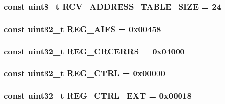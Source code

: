 \label{namespaceiGbReg_acf8e6d74b74043a94123494f59e5290c}
\hypertarget{namespaceiGbReg_ae95e1095a77a684508db779465f21ac2}{
\subsubsection[{RCV\_\-ADDRESS\_\-TABLE\_\-SIZE}]{\setlength{\rightskip}{0pt plus 5cm}const uint8\_\-t {\bf RCV\_\-ADDRESS\_\-TABLE\_\-SIZE} = 24}}
\label{namespaceiGbReg_ae95e1095a77a684508db779465f21ac2}
\hypertarget{namespaceiGbReg_a1c508b3181f153a1e8e98a6866906cd8}{
\subsubsection[{REG\_\-AIFS}]{\setlength{\rightskip}{0pt plus 5cm}const {\bf uint32\_\-t} {\bf REG\_\-AIFS} = 0x00458}}
\label{namespaceiGbReg_a1c508b3181f153a1e8e98a6866906cd8}
\hypertarget{namespaceiGbReg_a0ac38603fe50560ca10542b091cce4e3}{
\subsubsection[{REG\_\-CRCERRS}]{\setlength{\rightskip}{0pt plus 5cm}const {\bf uint32\_\-t} {\bf REG\_\-CRCERRS} = 0x04000}}
\label{namespaceiGbReg_a0ac38603fe50560ca10542b091cce4e3}
\hypertarget{namespaceiGbReg_a20020599b1b178310f589aad60b95d78}{
\subsubsection[{REG\_\-CTRL}]{\setlength{\rightskip}{0pt plus 5cm}const {\bf uint32\_\-t} {\bf REG\_\-CTRL} = 0x00000}}
\label{namespaceiGbReg_a20020599b1b178310f589aad60b95d78}
\hypertarget{namespaceiGbReg_aee737b7c1f7c88ebd5f043dd77266f7b}{
\subsubsection[{REG\_\-CTRL\_\-EXT}]{\setlength{\rightskip}{0pt plus 5cm}const {\bf uint32\_\-t} {\bf REG\_\-CTRL\_\-EXT} = 0x00018}}
